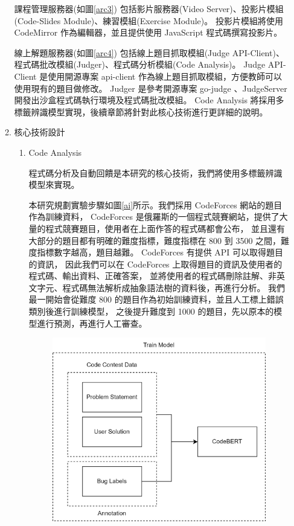 \documentclass[12pt]{article}
\begin{document}
\begin{enumerate}
\begin{enumerate}
        \par 課程管理服務器(如圖\ref{arc3})
          包括影片服務器(Video Server)、投影片模組(Code-Slides Module)、練習模組(Exercise Module)。
          投影片模組將使用 CodeMirror 作為編輯器，並且提供使用 JavaScript 程式碼撰寫投影片。
        \par 線上解題服務器(如圖\ref{arc4})
          包括線上題目抓取模組(Judge API-Client)、程式碼批改模組(Judger)、程式碼分析模組(Code Analysis)。
           Judge API-Client 是使用開源專案 api-client \cite{apiclient} 作為線上題目抓取模組，方便教師可以使用現有的題目做修改。
           Judger 是參考開源專案 go-judge \cite{judger1} 、JudgeServer \cite{judger2} 開發出沙盒程式碼執行環境及程式碼批改模組。
           Code Analysis 將採用多標籤辨識模型實現，後續章節將針對此核心技術進行更詳細的說明。
      \item 核心技術設計
        \begin{enumerate}[label=(\arabic*)]
            \setlength{\parindent}{2em}
            \item Code Analysis 
            \par 程式碼分析及自動回饋是本研究的核心技術，我們將使用多標籤辨識模型來實現。
            \par 本研究規劃實驗步驟如圖\ref{ai}所示。我們採用 CodeForces 網站的題目作為訓練資料，
            CodeForces 是俄羅斯的一個程式競賽網站，提供了大量的程式競賽題目，使用者在上面作答的程式碼都會公布，
            並且還有大部分的題目都有明確的難度指標，難度指標在 800 到 3500 之間，難度指標數字越高，題目越難。
            CodeForces 有提供 API 可以取得題目的資訊，
            因此我們可以在 CodeForces 上取得題目的資訊及使用者的程式碼、輸出資料、正確答案，
            並將使用者的程式碼刪除註解、非英文字元、程式碼無法解析成抽象語法樹的資料後，再進行分析。
            我們最一開始會從難度 800 的題目作為初始訓練資料，並且人工標上錯誤類別後進行訓練模型，
            之後提升難度到 1000 的題目，先以原本的模型進行預測，再進行人工審查。            
            \begin{figure}[htbp]
              \centering
              \includegraphics[width=1\textwidth]{./img/ai.jpg}

\end{figure}
\end{enumerate}
\end{enumerate}
\end{enumerate}
\end{document}
